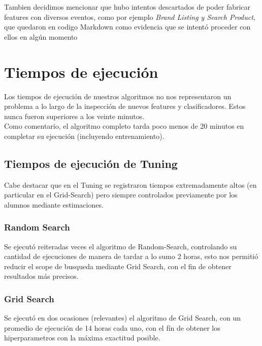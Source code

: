 \documentclass[a4paper ,12pt]{article}
\begin{document}
	
	
	Tambien decidimos mencionar que hubo intentos descartados de poder fabricar features con diversos eventos, como por ejemplo \textit{Brand Listing y Search Product}, que quedaron en codigo Markdown como evidencia que se intentó proceder con ellos en algún momento
	
\newpage

\section{Tiempos de ejecución}

	Los tiempos de ejecución de nuestros algoritmos no nos representaron un problema a lo largo de la inspección de nuevos features y clasificadores. Estos nunca fueron superiores a los veinte minutos.\\
	
	Como comentario, el algoritmo completo tarda poco menos de 20 minutos en completar su ejecución (incluyendo entrenamiento).
	
	
	\subsection{Tiempos de ejecución de Tuning}
	
	Cabe destacar que en el Tuning se registraron tiempos extremadamente altos (en particular en el Grid-Search) pero siempre controlados previamente por los alumnos mediante estimaciones.\\
	
	\subsubsection{Random Search}
	
	Se ejecutó reiteradas veces el algoritmo de Random-Search, controlando su cantidad de ejecuciones de manera de tardar a lo sumo 2 horas, esto nos permitió reducir el scope de busqueda mediante Grid Search, con el fin de obtener resultados más precisos.\\
	
	\subsubsection{Grid Search}
	
	Se ejecutó en dos ocasiones (relevantes) el algoritmo de Grid Search, con un promedio de ejecución de 14 horas cada uno, con el fín de obtener los hiperparametros con la máxima exactitud posible.
\end{document}

